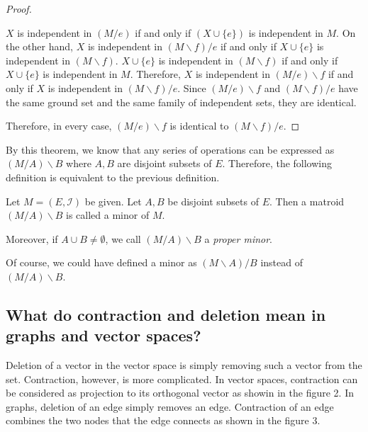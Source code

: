 \begin{proof}
\begin{enumerate}
$X$ is independent in $(M / e)$ if and only if $(X \cup \{ e \})$ is independent in $M$.
On the other hand, $X$ is independent in $(M \backslash f) / e$ if and only if $X \cup \{ e \}$ is independent in $(M \backslash f)$.
$X \cup \{ e \}$ is independent in $(M \backslash f)$ if and only if $X \cup \{ e \}$ is independent in $M$.
Therefore, $X$ is independent in $(M / e) \backslash f$ if and only if $X$ is independent in $(M \backslash f) / e$.
Since $(M / e) \backslash f$ and $(M \backslash f) / e$ have the same ground set and the same family of independent sets, they are identical.
\end{enumerate}
Therefore, in every case, $(M / e) \backslash f$ is identical to $(M \backslash f) / e$.
\end{proof}

By this theorem, we know that any series of operations can be expressed as $(M / A) \backslash B$ where $A, B$ are disjoint subsets of $E$.
Therefore, the following definition is equivalent to the previous definition.

\begin{defn}
Let $M = (E, \mathcal{I})$ be given.
Let $A, B$ be disjoint subsets of $E$.
Then a matroid $(M / A) \backslash B$ is called a minor of $M$.
\end{defn}

Moreover, if $A \cup B \neq \emptyset$, we call $(M / A) \backslash B$ a \textit{proper minor}.

Of course, we could have defined a minor as $(M \backslash A) / B$ instead of $(M / A) \backslash B$.


\subsection{What do contraction and deletion mean in graphs and vector spaces?}
Deletion of a vector in the vector space is simply removing such a vector from the set.
Contraction, however, is more complicated.
In vector spaces, contraction can be considered as projection to its orthogonal vector as showin in the figure 2.
In graphs, deletion of an edge simply removes an edge. Contraction of an edge combines the two nodes that the edge connects as shown in the figure 3.

